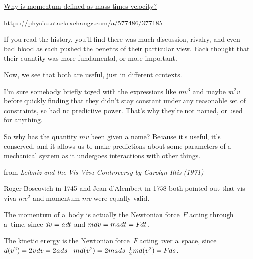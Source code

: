 \href{https://physics.stackexchange.com/questions/577332/why-is-momentum-defined-as-mass-times-velocity}{Why is momentum defined as mass times velocity?}

{\small

https://physics.stackexchange.com/a/577486/377185

If you read the history, you’ll find there was much discussion, rivalry, and even bad blood as each pushed the benefits of their particular view. Each thought that their quantity was more fundamental, or more important.

Now, we see that both are useful, just in different contexts.

I’m sure somebody briefly toyed with the expressions like ${m v^3}$ and maybe ${m^2 v}$ before quickly finding that they didn’t stay constant under any reasonable set of constraints, so had no predictive power. That’s why they’re not named, or used for anything.

So why has the quantity ${m v}$ been given a name? Because it’s useful, it’s conserved, and it allows us to make predictions about some parameters of a mechanical system as it undergoes interactions with other things.

\par}

from \emph{Leibniz and the Vis Viva Controversy by Carolyn Iltis (1971)}

Roger Boscovich in 1745 and Jean d’Alembert in 1758 both pointed out that vis viva ${mv^2}$ and momentum ${mv}$ were equally valid.

The momentum of a~body
is actually the Newtonian force~$F$
acting through a~time,
since ${dv = a \hspace{.1ex} dt}$ and ${m \hspace{.1ex} dv = m \hspace{.1ex} a \hspace{.1ex} dt = F \hspace{-0.1ex} dt}$.

The kinetic energy
is the Newtonian force~$F$
acting over a~space,
since ${d(v^2) = 2 \hspace{.1ex} v \hspace{.1ex} dv = 2 \hspace{.1ex} a \hspace{.1ex} ds}$
~${m \hspace{.1ex} d(v^2) = 2 \hspace{.1ex} m \hspace{.1ex} a \hspace{.1ex} ds}$
${\frac{1}{2} \hspace{.1ex} m \hspace{.1ex} d(v^2) = F ds}$.

